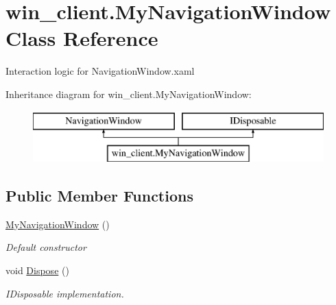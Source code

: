 \hypertarget{classwin__client_1_1_my_navigation_window}{\section{win\-\_\-client.\-My\-Navigation\-Window Class Reference}
\label{classwin__client_1_1_my_navigation_window}
}


Interaction logic for Navigation\-Window.\-xaml  


Inheritance diagram for win\-\_\-client.\-My\-Navigation\-Window\-:\begin{figure}[H]
\begin{center}
\leavevmode
\includegraphics[height=2.000000cm]{classwin__client_1_1_my_navigation_window}
\end{center}
\end{figure}
\subsection*{Public Member Functions}
\begin{DoxyCompactItemize}
\item 
\hyperlink{classwin__client_1_1_my_navigation_window_a22eca8ed32129667416a82c2b32484a3}{My\-Navigation\-Window} ()
\begin{DoxyCompactList}\small\item\em Default constructor \end{DoxyCompactList}\item 
void \hyperlink{classwin__client_1_1_my_navigation_window_a8bca744c885a4a0eb21ee74f301292b8}{Dispose} ()
\begin{DoxyCompactList}\small\item\em I\-Disposable implementation. \end{DoxyCompactList}\end{DoxyCompactItemize}
